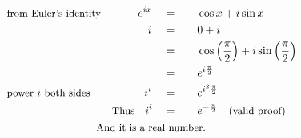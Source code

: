\begin{alignat*}{5}
&\small\text{from Euler's identity}&e^{ix}\quad&=\quad&&\cos{x}+i\sin{x}\\
&\,&i\quad&=&&0+i\\
&\,&\,&=&&\cos{\left(\frac{\pi}{2}\right)}+i\sin{\left(\frac{\pi}{2}\right)}\\
&\,&\,&=&&e^{i\frac{\pi}{2}}\\
&\small\text{power }\normalsize i\small\text{ both sides}&i^i\quad&=&& e^{i^2\frac{\pi}{2}}\\
&\,&\small\text{Thus}\quad i^i\quad&=&&e^{-\frac{\pi}{2}}\quad\small\text{(valid proof)}\\
&\rlap{\qquad\qquad\qquad\qquad\small\text{And it is a real number.}}
\end{alignat*}
